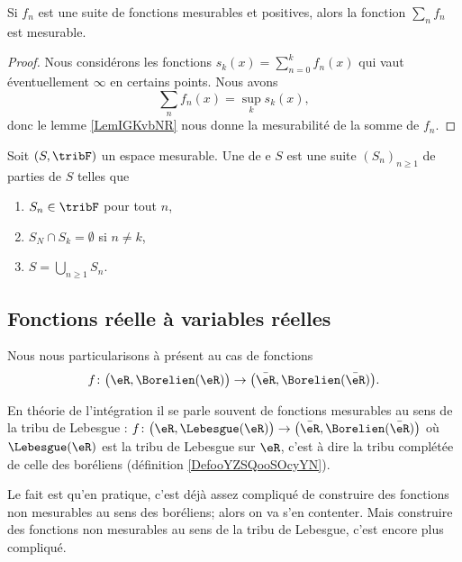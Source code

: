 \begin{proposition}\label{PropFYPEOIJ}
    Si \( f_n\) est une suite de fonctions mesurables et positives, alors la fonction \( \sum_nf_n\) est mesurable.
\end{proposition}

\begin{proof}
    Nous considérons les fonctions \( s_k(x)=\sum_{n=0}^kf_n(x)\) qui vaut éventuellement \( \infty\) en certains points. Nous avons
    \begin{equation}
        \sum_nf_n(x)=\sup_ks_k(x),
    \end{equation}
    donc le lemme \ref{LemIGKvbNR} nous donne la mesurabilité de la somme de \( f_n\).
\end{proof}

\begin{definition}
    Soit \( (S,\tribF)\) un espace mesurable. 
    Une  de e \( S\) est une suite  \( (S_n)_{n\geq 1}\) de parties de \( S\) telles que
    \begin{enumerate}
        \item
            \( S_n\in\tribF\) pour tout \( n\),
        \item
            \( S_N\cap S_k=\emptyset\) si \( n\neq k\),
        \item
            \( S=\bigcup_{n\geq 1}S_n\).
    \end{enumerate}
\end{definition}

\subsection{Fonctions réelle à variables réelles}

Nous nous particularisons à présent au cas de fonctions
\begin{equation}
    f\colon \big( \eR,\Borelien(\eR) \big)\to \big( \bar\eR,\Borelien(\bar \eR) \big).
\end{equation}

\begin{remark}
    En théorie de l'intégration il se parle souvent de fonctions mesurables au sens de la tribu de Lebesgue : $f\colon \big( \eR,\Lebesgue(\eR) \big)\to \big( \bar\eR,\Borelien(\bar \eR) \big)$ où \( \Lebesgue(\eR)\) est la tribu de Lebesgue sur \( \eR\), c'est à dire la tribu complétée de celle des boréliens (définition \ref{DefooYZSQooSOcyYN}).

    Le fait est qu'en pratique, c'est déjà assez compliqué de construire des fonctions non mesurables au sens des boréliens; alors on va s'en contenter. Mais construire des fonctions non mesurables au sens de la tribu de Lebesgue, c'est encore plus compliqué.
\end{remark}

